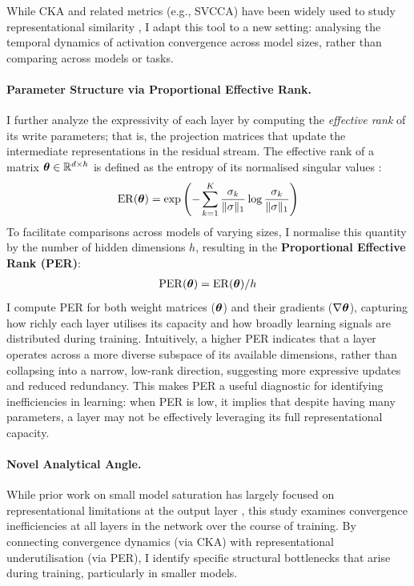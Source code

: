While CKA and related metrics (e.g., SVCCA) have been widely used to study representational similarity \citep{wu2020similarity, phang2021finetuned, brown2023understanding}, I adapt this tool to a new setting: analysing the temporal dynamics of activation convergence across model sizes, rather than comparing across models or tasks.

\paragraph{Parameter Structure via Proportional Effective Rank.}
I further analyze the expressivity of each layer by computing the \textit{effective rank} of its write parameters; that is, the projection matrices that update the intermediate representations in the residual stream. The effective rank of a matrix $\boldsymbol{\theta} \in \mathbb{R}^{d \times h}$ is defined as the entropy of its normalised singular values \citep{roy2007effectiverank}:
\begin{align}
    \mathrm{ER}(\boldsymbol{\theta}) = \exp\left(-\sum_{k=1}^K \frac{\sigma_k}{\|\sigma\|_1} \log \frac{\sigma_k}{\|\sigma\|_1}\right)
\end{align}
To facilitate comparisons across models of varying sizes, I normalise this quantity by the number of hidden dimensions $h$, resulting in the \textbf{Proportional Effective Rank (PER)}:
\begin{align}
    \mathrm{PER}(\boldsymbol{\theta}) = \mathrm{ER}(\boldsymbol{\theta}) / h
\end{align}
I compute PER for both weight matrices ($\boldsymbol{\theta}$) and their gradients ($\nabla \boldsymbol{\theta}$), capturing how richly each layer utilises its capacity and how broadly learning signals are distributed during training. Intuitively, a higher PER indicates that a layer operates across a more diverse subspace of its available dimensions, rather than collapsing into a narrow, low-rank direction, suggesting more expressive updates and reduced redundancy. This makes PER a useful diagnostic for identifying inefficiencies in learning: when PER is low, it implies that despite having many parameters, a layer may not be effectively leveraging its full representational capacity.


\paragraph{Novel Analytical Angle.}
While prior work on small model saturation has largely focused on representational limitations at the output layer \citep{godey2024small, yang2018breaking}, this study examines convergence inefficiencies at all layers in the network over the course of training. By connecting convergence dynamics (via CKA) with representational underutilisation (via PER), I identify specific structural bottlenecks that arise during training, particularly in smaller models.

